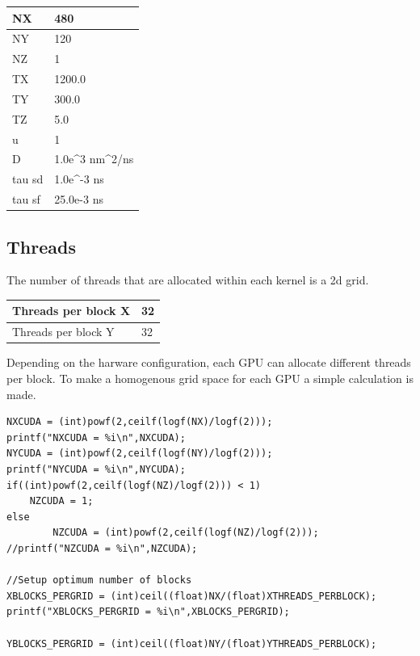 \begin{table}[h]
\centering
\begin{tabular}{| l | l |}
\hline   
NX     & 480                                            \\
\hline   
NY     & 120                                            \\
\hline   
NZ     & 1                                              \\
\hline   
TX     & 1200.0                                         \\
\hline   
TY     & 300.0                                          \\
\hline   
TZ     & 5.0                                            \\
\hline   
u      & 1                                              \\
\hline   
D      & 1.0e\textasciicircum 3 nm\textasciicircum 2/ns \\
\hline   
tau sd & 1.0e\textasciicircum -3 ns                     \\
\hline   
tau sf & 25.0e-3 ns      \\
\hline   
\end{tabular}
\end{table}


\subsection{Threads}

The number of threads that are allocated within each kernel is a 2d grid.

\begin{table}[h]
\centering
\begin{tabular}{| l | l |}
\hline   
Threads per block  X   & 32       \\
\hline   
Threads per block Y     & 32         \\
\hline
\end{tabular}
\end{table}

Depending on the harware configuration, each GPU can allocate different threads per block. To make a homogenous grid space for each GPU a simple calculation is made.

\begin{lstlisting}[frame=none]
NXCUDA = (int)powf(2,ceilf(logf(NX)/logf(2)));
printf("NXCUDA = %i\n",NXCUDA);
NYCUDA = (int)powf(2,ceilf(logf(NY)/logf(2)));
printf("NYCUDA = %i\n",NYCUDA);
if((int)powf(2,ceilf(logf(NZ)/logf(2))) < 1)
	NZCUDA = 1;
else
        NZCUDA = (int)powf(2,ceilf(logf(NZ)/logf(2)));
//printf("NZCUDA = %i\n",NZCUDA);

//Setup optimum number of blocks
XBLOCKS_PERGRID = (int)ceil((float)NX/(float)XTHREADS_PERBLOCK); 
printf("XBLOCKS_PERGRID = %i\n",XBLOCKS_PERGRID);

YBLOCKS_PERGRID = (int)ceil((float)NY/(float)YTHREADS_PERBLOCK); 
\end{lstlisting}


